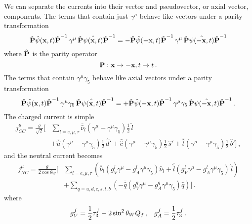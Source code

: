   We can separate the currents into their vector and pseudovector, or axial
  vector, components. The terms that contain just $\gamma^{\mu}$ behave like
  vectors under a parity transformation
  \begin{equation}
    \hat{\textrm{\textbf{P}}}\hat{\psi}(\textbf{x},t)\hat{\textrm{\textbf{P}}}^{-1} \, 
      \gamma^{\mu} \, \hat{\textrm{\textbf{P}}}\hat{\psi(\textbf{x},t)}\hat{\textrm{\textbf{P}}}^{-1} 
      = - \hat{\textrm{\textbf{P}}}\hat{\psi}(-\textbf{x},t)\hat{\textrm{\textbf{P}}}^{-1} \, 
      \gamma^{\mu} \, \hat{\textrm{\textbf{P}}}\hat{\psi(-\textbf{x},t)}\hat{\textrm{\textbf{P}}}^{-1}
  \end{equation}
  where $\hat{\textrm{\textbf{P}}}$ is the parity operator
  \begin{equation}
    \textrm{\textbf{P}}: \textbf{x} \rightarrow -\textbf{x}, t \rightarrow t \,.
  \end{equation}
  The terms that contain $\gamma^{\mu}\gamma_{5}$ behave like axial vectors
  under a parity transformation
  \begin{equation}
    \hat{\textrm{\textbf{P}}}\hat{\psi}(\textbf{x},t)\hat{\textrm{\textbf{P}}}^{-1} \, 
      \gamma^{\mu}\gamma_5 \, \hat{\textrm{\textbf{P}}}\hat{\psi(\textbf{x},t)}\hat{\textrm{\textbf{P}}}^{-1} 
      = + \hat{\textrm{\textbf{P}}}\hat{\psi}(-\textbf{x},t)\hat{\textrm{\textbf{P}}}^{-1} \, 
      \gamma^{\mu}\gamma_5 \, \hat{\textrm{\textbf{P}}}\hat{\psi(-\textbf{x},t)}\hat{\textrm{\textbf{P}}}^{-1}
      \,.
  \end{equation}
  The charged current is simple
  \begin{equation}
    \begin{aligned}
    j^{\mu}_{CC} = \frac{g}{\sqrt{2}}\Bigg[&\sum_{l=e,\mu,\tau} \bar{\hat{\nu}}_l (\gamma^{\mu} 
          - \gamma^{\mu}\gamma_5)\frac{1}{2}\,\hat{l} \\
      &+ \bar{\hat{u}}(\gamma^{\mu} - \gamma^{\mu}\gamma_5)\frac{1}{2}\, \hat{d}'
      + \bar{\hat{c}}(\gamma^{\mu} - \gamma^{\mu}\gamma_5)\frac{1}{2}\, \hat{s}'
      + \bar{\hat{t}}(\gamma^{\mu} - \gamma^{\mu}\gamma_5)\frac{1}{2}\, \hat{b}' \Bigg] \,,
    \end{aligned}
  \end{equation}
  and the neutral current becomes
  \begin{equation}
    \begin{aligned}
        j^{\mu}_{NC} = \frac{g}{2\cos\theta_W} \Bigg[&\sum_{l=e,\mu,\tau} 
        \left(\bar{\hat{\nu}}_{l}(g_V^{l} \gamma^{\mu}- g_A^{l} \gamma^{\mu}\gamma_5) \hat{\nu}_{l} 
         + \bar{\hat{l}}(g_V^{l} \gamma^{\mu}- g_A^{l} \gamma^{\mu}\gamma_5)\, \hat{l} \right) \\
        &+ \sum_{q=u,d,c,s,t,b} 
         \left(- \bar{\hat{q}} (g_V^{q} \gamma^{\mu}-g_A^{q} \gamma^{\mu}\gamma_5)\hat{q} \right)\Bigg] \,.
     \end{aligned}
  \end{equation}
  where 
  \begin{equation}
    g_V^{f} = \frac{1}{2}\tau_3^{f} - 2\sin^2\theta_W Q_f \,,
    \hspace{3mm}
    g_A^{f} = \frac{1}{2}\tau_3^{f} \,.
  \end{equation}

